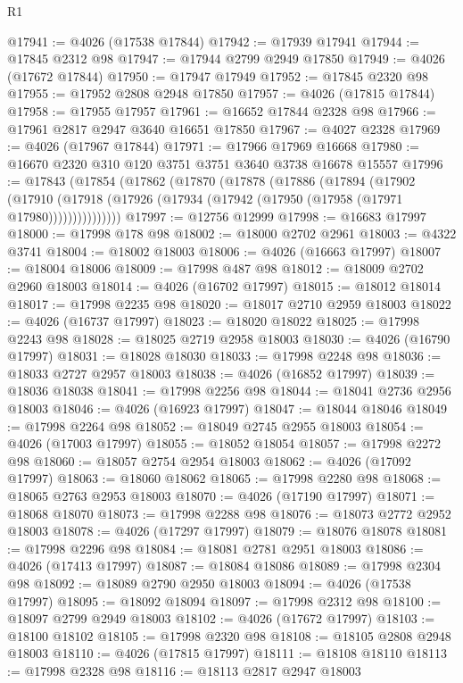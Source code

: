 \begin{lexlean}{R1}
\begin{coremodule}
@17941 := @4026 (@17538 @17844)
@17942 := @17939 @17941
@17944 := @17845 @2312 @98
@17947 := @17944 @2799 @2949 @17850
@17949 := @4026 (@17672 @17844)
@17950 := @17947 @17949
@17952 := @17845 @2320 @98
@17955 := @17952 @2808 @2948 @17850
@17957 := @4026 (@17815 @17844)
@17958 := @17955 @17957
@17961 := @16652 @17844 @2328 @98
@17966 := @17961 @2817 @2947 @3640 @16651 @17850
@17967 := @4027 @2328
@17969 := @4026 (@17967 @17844)
@17971 := @17966 @17969 @16668
@17980 := @16670 @2320 @310 @120 @3751 @3751 @3640 @3738 @16678 @15557
@17996 := @17843
    (@17854
      (@17862
        (@17870
          (@17878
            (@17886
              (@17894
                (@17902
                  (@17910
                    (@17918 (@17926 (@17934 (@17942 (@17950 (@17958 (@17971 @17980)))))))))))))))
@17997 := @12756 @12999
@17998 := @16683 @17997
@18000 := @17998 @178 @98
@18002 := @18000 @2702 @2961
@18003 := @4322 @3741
@18004 := @18002 @18003
@18006 := @4026 (@16663 @17997)
@18007 := @18004 @18006
@18009 := @17998 @487 @98
@18012 := @18009 @2702 @2960 @18003
@18014 := @4026 (@16702 @17997)
@18015 := @18012 @18014
@18017 := @17998 @2235 @98
@18020 := @18017 @2710 @2959 @18003
@18022 := @4026 (@16737 @17997)
@18023 := @18020 @18022
@18025 := @17998 @2243 @98
@18028 := @18025 @2719 @2958 @18003
@18030 := @4026 (@16790 @17997)
@18031 := @18028 @18030
@18033 := @17998 @2248 @98
@18036 := @18033 @2727 @2957 @18003
@18038 := @4026 (@16852 @17997)
@18039 := @18036 @18038
@18041 := @17998 @2256 @98
@18044 := @18041 @2736 @2956 @18003
@18046 := @4026 (@16923 @17997)
@18047 := @18044 @18046
@18049 := @17998 @2264 @98
@18052 := @18049 @2745 @2955 @18003
@18054 := @4026 (@17003 @17997)
@18055 := @18052 @18054
@18057 := @17998 @2272 @98
@18060 := @18057 @2754 @2954 @18003
@18062 := @4026 (@17092 @17997)
@18063 := @18060 @18062
@18065 := @17998 @2280 @98
@18068 := @18065 @2763 @2953 @18003
@18070 := @4026 (@17190 @17997)
@18071 := @18068 @18070
@18073 := @17998 @2288 @98
@18076 := @18073 @2772 @2952 @18003
@18078 := @4026 (@17297 @17997)
@18079 := @18076 @18078
@18081 := @17998 @2296 @98
@18084 := @18081 @2781 @2951 @18003
@18086 := @4026 (@17413 @17997)
@18087 := @18084 @18086
@18089 := @17998 @2304 @98
@18092 := @18089 @2790 @2950 @18003
@18094 := @4026 (@17538 @17997)
@18095 := @18092 @18094
@18097 := @17998 @2312 @98
@18100 := @18097 @2799 @2949 @18003
@18102 := @4026 (@17672 @17997)
@18103 := @18100 @18102
@18105 := @17998 @2320 @98
@18108 := @18105 @2808 @2948 @18003
@18110 := @4026 (@17815 @17997)
@18111 := @18108 @18110
@18113 := @17998 @2328 @98
@18116 := @18113 @2817 @2947 @18003

\end{coremodule}
\end{lexlean}
